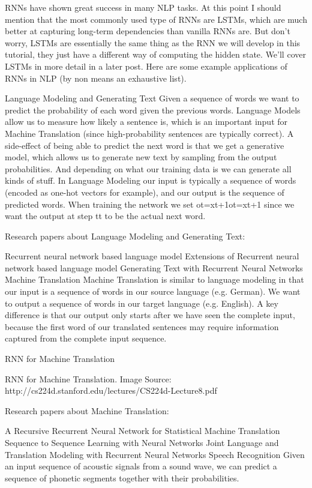 RNNs have shown great success in many NLP tasks. At this point I should mention that the most commonly used type of RNNs are LSTMs, which are much better at capturing long-term dependencies than vanilla RNNs are. But don’t worry, LSTMs are essentially the same thing as the RNN we will develop in this tutorial, they just have a different way of computing the hidden state. We’ll cover LSTMs in more detail in a later post. Here are some example applications of RNNs in NLP (by non means an exhaustive list).

Language Modeling and Generating Text
Given a sequence of words we want to predict the probability of each word given the previous words. Language Models allow us to measure how likely a sentence is, which is an important input for Machine Translation (since high-probability sentences are typically correct). A side-effect of being able to predict the next word is that we get a generative model, which allows us to generate new text by sampling from the output probabilities. And depending on what our training data is we can generate all kinds of stuff. In Language Modeling our input is typically a sequence of words (encoded as one-hot vectors for example), and our output is the sequence of predicted words. When training the network we set ot=xt+1ot=xt+1 since we want the output at step tt to be the actual next word.

Research papers about Language Modeling and Generating Text:

Recurrent neural network based language model
Extensions of Recurrent neural network based language model
Generating Text with Recurrent Neural Networks
Machine Translation
Machine Translation is similar to language modeling in that our input is a sequence of words in our source language (e.g. German). We want to output a sequence of words in our target language (e.g. English). A key difference is that our output only starts after we have seen the complete input, because the first word of our translated sentences may require information captured from the complete input sequence.

RNN for Machine Translation


RNN for Machine Translation. Image Source: http://cs224d.stanford.edu/lectures/CS224d-Lecture8.pdf

Research papers about Machine Translation:

A Recursive Recurrent Neural Network for Statistical Machine Translation
Sequence to Sequence Learning with Neural Networks
Joint Language and Translation Modeling with Recurrent Neural Networks
Speech Recognition
Given an input sequence of acoustic signals from a sound wave, we can predict a sequence of phonetic segments together with their probabilities.

